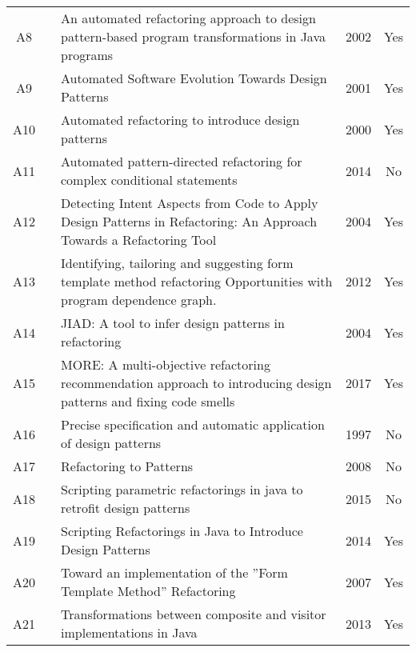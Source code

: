 \begin{longtable}{cp{3cm}p{8cm}cc}
A8  & \citeauthor*{sang1183003}              & An automated refactoring approach to design pattern-based program transformations in Java programs                  & 2002 & Yes      \\
A9  & \citeauthor*{Cinneide602499}           & Automated Software Evolution Towards Design Patterns                                                                & 2001 & Yes      \\
A10 & \citeauthor*{cinneide337612}           & Automated refactoring to introduce design patterns                                                                  & 2000 & Yes      \\
A11 & \citeauthor*{Liu2014}                  & Automated pattern-directed refactoring for complex conditional statements                                           & 2014 & No       \\
A12 & \citeauthor*{ram2004detecting}         & Detecting Intent Aspects from Code to Apply Design Patterns in Refactoring: An Approach Towards a Refactoring Tool  & 2004 & Yes      \\
A13 & \citeauthor*{hotta6178876}             & Identifying, tailoring and suggesting form template method refactoring Opportunities with program dependence graph. & 2012 & Yes      \\
A14 & \citeauthor*{rajesh1013988}            & JIAD: A tool to infer design patterns in refactoring                                                                & 2004 & Yes      \\
A15 & \citeauthor*{ouni2017more}             & MORE: A multi-objective refactoring recommendation approach to introducing design patterns and fixing code smells   & 2017 & Yes      \\
A16 & \citeauthor*{eden632834}               & Precise specification and automatic application of design patterns                                                  & 1997 & No       \\
A17 & \citeauthor*{kerievsky2005refactoring} & Refactoring to Patterns                                                                                             & 2008 & No       \\
A18 & \citeauthor*{kim7332467}               & Scripting parametric refactorings in java to retrofit design patterns                                               & 2015 & No       \\
A19 & \citeauthor*{kim2014scripting}         & Scripting Refactorings in Java to Introduce Design Patterns                                                         & 2014 & Yes      \\
A20 & \citeauthor*{juillerat4362900}         & Toward an implementation of the ”Form Template Method” Refactoring                                                  & 2007 & Yes      \\
A21 & \citeauthor*{ajouli6619484}            & Transformations between composite and visitor implementations in Java                                               & 2013 & Yes     
\end{longtable}